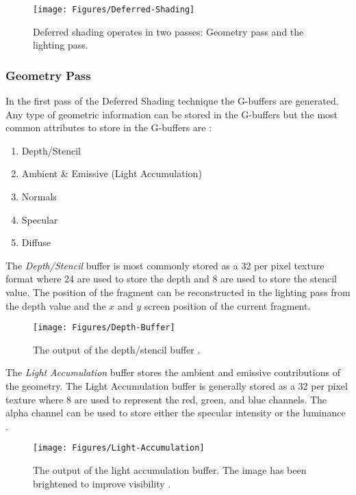 \begin{figure}[H]
\centering
\texttt{[image: Figures/Deferred-Shading]}
\decoRule
\caption{Deferred shading operates in two passes: Geometry pass and the lighting pass.}
\label{fig:Deferred-Shading}
\end{figure}

\subsubsection{Geometry Pass}

In the first pass of the Deferred Shading technique the G-buffers are generated. Any type of geometric information can be stored in the G-buffers but the most common attributes to store in the G-buffers are \parencite{42_hargreaves_harris_2004, 9_shishkovtsov_2006, 10_vanderleeuw_2007}:

\begin{enumerate}
\item{Depth/Stencil}
\item{Ambient \& Emissive (Light Accumulation)}
\item{Normals}
\item{Specular}
\item{Diffuse}
\end{enumerate}

The \emph{Depth/Stencil} buffer is most commonly stored as a \SI{32}{\bit} per pixel texture format where \SI{24}{\bit} are used to store the depth and \SI{8}{\bit} are used to store the stencil value. The position of the fragment can be reconstructed in the lighting pass from the depth value and the $x$ and $y$ screen position of the current fragment.

\begin{figure}[H]
\centering
\texttt{[image: Figures/Depth-Buffer]}
\decoRule
\caption{The output of the depth/stencil buffer \parencite{17_vanoosten_2015}.}
\label{fig:Depth-Buffer}
\end{figure}

The \emph{Light Accumulation} buffer stores the ambient and emissive contributions of the geometry. The Light Accumulation buffer is generally stored as a \SI{32}{\bit} per pixel texture where \SI{8}{\bit} are used to represent the red, green, and blue channels. The alpha channel can be used to store either the specular intensity \parencite{42_hargreaves_harris_2004} or the luminance \parencite{10_vanderleeuw_2007}.

\begin{figure}[H]
\centering
\texttt{[image: Figures/Light-Accumulation]}
\decoRule
\caption{The output of the light accumulation buffer. The image has been brightened to improve visibility \parencite{17_vanoosten_2015}.}
\label{fig:Light-Accumulation-Buffer}
\end{figure}

